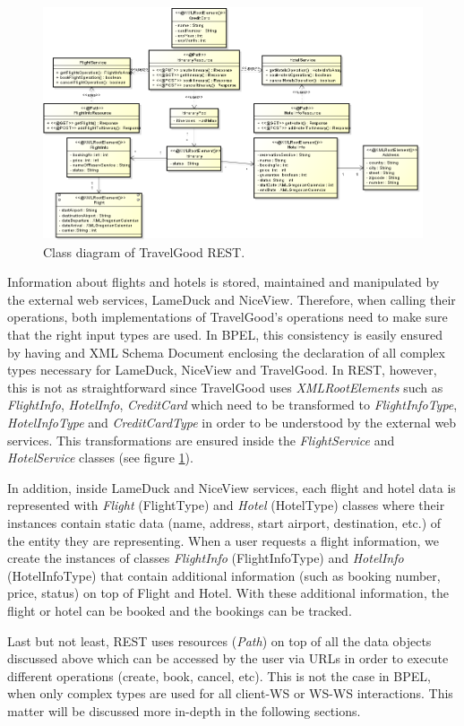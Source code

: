 \begin{figure}[H]
\centering
\includegraphics[width=\textwidth]{images/REST}
\caption{Class diagram of TravelGood REST.}
\label{classdiagramREST}
\end{figure}

Information about flights and hotels is stored, maintained and manipulated by the external web services, LameDuck and NiceView. Therefore, when calling their operations, both implementations of TravelGood’s operations need to make sure that the right input types are used. In BPEL, this consistency is easily ensured by having and XML Schema Document enclosing the declaration of all complex types necessary for LameDuck, NiceView and TravelGood. In REST, however, this is not as straightforward since TravelGood uses \textit{XMLRootElements} such as \textit{FlightInfo}, \textit{HotelInfo}, \textit{CreditCard} which need to be transformed to \textit{FlightInfoType}, \textit{HotelInfoType} and \textit{CreditCardType} in order to be understood by the external web services. This transformations are ensured inside the \textit{FlightService} and \textit{HotelService} classes (see figure \ref{classdiagramREST}).

In addition, inside LameDuck and NiceView services, each flight and hotel data is represented with \textit{Flight} (FlightType) and \textit{Hotel} (HotelType) classes where their instances contain static data (name, address, start airport, destination, etc.) of the entity they are representing. When a user requests a flight information, we create the instances of classes \textit{FlightInfo} (FlightInfoType) and \textit{HotelInfo} (HotelInfoType) that contain additional information (such as booking number, price, status) on top of Flight and Hotel. With these additional information, the flight or hotel can be booked and the bookings can be tracked. 

Last but not least, REST uses resources (\textit{\@ Path}) on top of all the data objects discussed above which can be accessed by the user via URLs in order to execute different operations (create, book, cancel, etc). This is not the case in BPEL, when only complex types are used for all client-WS or WS-WS interactions. This matter will be discussed more in-depth in the following sections.
